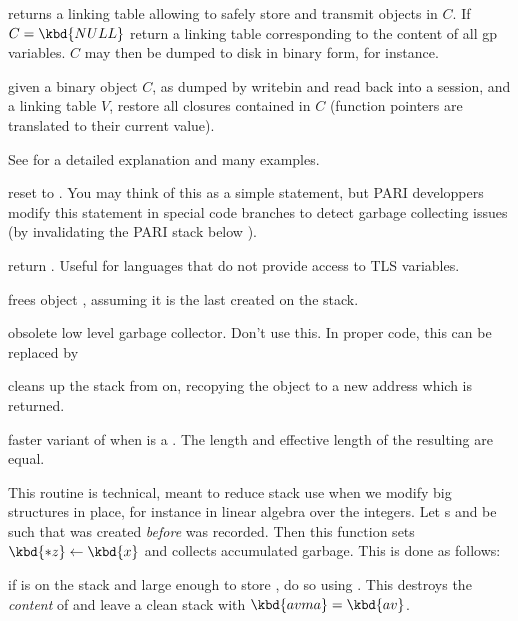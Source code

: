  returns a linking table allowing to safely
store and transmit  objects in $C$.  If $C = \kbd{NULL}$ return a
linking table corresponding to the content of all gp variables. $C$ may then be
dumped to disk in binary form, for instance.

 given a binary object $C$, as dumped
by writebin and read back into a session, and a linking table $V$, restore all
closures contained in $C$ (function pointers are translated to their current
value).

\label{se:garbage2}
See  for a detailed explanation and many examples.

 reset  to . You may think
of this as a simple  statement, but PARI developpers modify
this statement in special code branches to detect garbage collecting
issues (by invalidating the PARI stack below ).

 return . Useful for languages that
do not provide access to TLS variables.

 frees object , assuming it is the last created
on the stack.

 obsolete low level garbage
collector. Don't use this. In proper code, this can be replaced by

 cleans up the stack from
 on, recopying the object  to a new address which is
returned.

 faster variant of  when
 is a . The length and effective length of the resulting
 are equal.

 This routine is technical,
meant to reduce stack use when we modify big structures in place, for
instance in linear algebra over the integers. Let s 
and  be such that  was created \emph{before}  was
recorded. Then this function sets $\kbd{*z} \leftarrow \kbd{x}$ and collects
accumulated garbage. This is done as follows:

\item if  is on the stack and large enough to store , do so
using . This destroys the \emph{content} of  and leave a
clean stack with $\kbd{avma} = \kbd{av}$.

